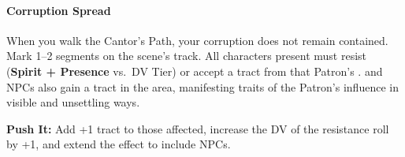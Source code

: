 \paragraph{Corruption Spread}
When you walk the Cantor’s Path, your corruption does not remain contained. 
Mark 1--2 segments on the scene’s  track. 
All characters present must resist (\textbf{Spirit + Presence} vs.~DV Tier) or accept a tract from that Patron’s . 
 and  NPCs also gain a tract in the area, manifesting traits of the Patron’s influence in visible and unsettling ways. 

\textbf{Push It:} Add +1 tract to those affected, increase the DV of the resistance roll by +1, and extend the effect to include  NPCs.
